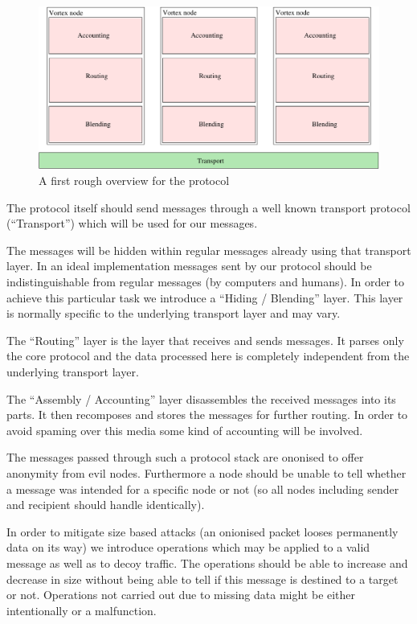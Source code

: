 \begin{figure}[h]
	\includegraphics[width=\columnwidth]{inc/roughProtocolDesign.pdf}
	\caption{A first rough overview for the protocol}
	\label{fig:roughProtocolDesign}
\end{figure}	

The protocol itself should send messages through a well known transport protocol (``Transport'') which will be used for our messages. 

The messages will be hidden within regular messages already using that transport layer. In an ideal implementation messages sent by our protocol should be indistinguishable from regular messages (by computers and humans). In order to achieve this particular task we introduce a ``Hiding / Blending'' layer. This layer is normally specific to the underlying transport layer and may vary.

The ``Routing'' layer is the layer that receives and sends messages. It parses only the core protocol and the data processed here is completely independent from the underlying transport layer.

The ``Assembly / Accounting'' layer disassembles the received messages into its parts. It then recomposes and stores the messages for further routing. In order to avoid spaming over this media some kind of accounting will be involved. 

The messages passed through such a protocol stack are ononised to offer anonymity from evil nodes. Furthermore a node should be unable to tell whether a message was intended for a specific node or not (so all nodes including sender and recipient should handle identically).

In order to mitigate size based attacks (an onionised packet looses permanently data on its way) we introduce operations which may be applied to a valid message as well as to decoy traffic. The operations should be able to increase and decrease in size without being able to tell if this message is destined to a target or not. Operations not carried out due to missing data might be either intentionally or a malfunction.

